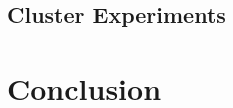 \documentclass{article}
\begin{document}
\subsection{Cluster Experiments}

\section{Conclusion }












\end{document}
